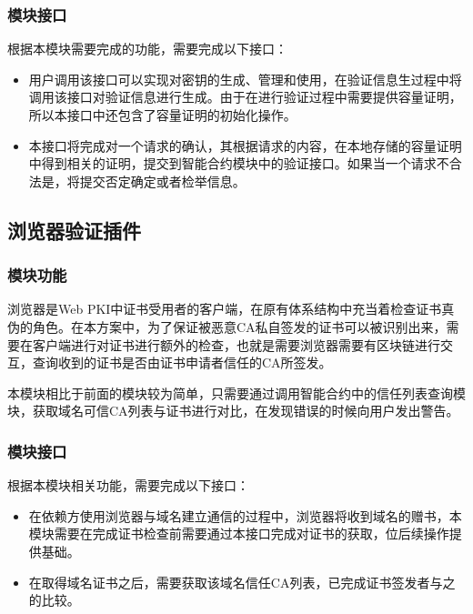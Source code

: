 \subsubsection{模块接口}

根据本模块需要完成的功能，需要完成以下接口：



\begin{itemize}
	\item 
	\noindent{}

	用户调用该接口可以实现对密钥的生成、管理和使用，在验证信息生过程中将调用该接口对验证信息进行生成。由于在进行验证过程中需要提供容量证明，所以本接口中还包含了容量证明的初始化操作。

	\item
	\noindent{}

	本接口将完成对一个请求的确认，其根据请求的内容，在本地存储的容量证明中得到相关的证明，提交到智能合约模块中的验证接口。如果当一个请求不合法是，将提交否定确定或者检举信息。
	

\end{itemize}


\subsection{浏览器验证插件}

\subsubsection{模块功能}

浏览器是Web PKI中证书受用者的客户端，在原有体系结构中充当着检查证书真伪的角色。在本方案中，为了保证被恶意CA私自签发的证书可以被识别出来，需要在客户端进行对证书进行额外的检查，也就是需要浏览器需要有区块链进行交互，查询收到的证书是否由证书申请者信任的CA所签发。

本模块相比于前面的模块较为简单，只需要通过调用智能合约中的信任列表查询模块，获取域名可信CA列表与证书进行对比，在发现错误的时候向用户发出警告。

\subsubsection{模块接口}

根据本模块相关功能，需要完成以下接口：

\begin{itemize}
	\item 
	\noindent{}

	在依赖方使用浏览器与域名建立通信的过程中，浏览器将收到域名的赠书，本模块需要在完成证书检查前需要通过本接口完成对证书的获取，位后续操作提供基础。

	\item
	\noindent{}

	在取得域名证书之后，需要获取该域名信任CA列表，已完成证书签发者与之的比较。
	

\end{itemize}



